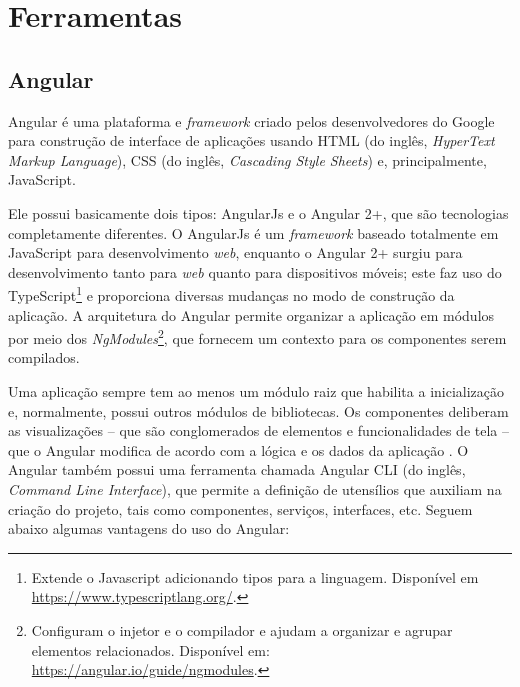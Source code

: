 \section{Ferramentas}
\label{sec:ferramentas}

\subsection{Angular}
\label{ssec:Angular}
Angular\cite{afonso2018angular} é uma plataforma e \textit{framework} criado pelos desenvolvedores do Google para construção de interface de aplicações usando HTML (do inglês, \textit{HyperText Markup Language}), CSS (do inglês, \textit{Cascading Style Sheets}) e, principalmente, JavaScript. 

Ele possui basicamente dois tipos: AngularJs e o Angular 2+, que são tecnologias completamente diferentes. O AngularJs é um \textit{framework} baseado totalmente em JavaScript para desenvolvimento \textit{web}, enquanto o Angular 2+ surgiu para desenvolvimento tanto para \textit{web} quanto para dispositivos móveis; este faz uso do TypeScript\footnote{Extende o Javascript adicionando tipos para a linguagem. Disponível em \url{https://www.typescriptlang.org/}.} e proporciona diversas mudanças no modo de construção da aplicação. A arquitetura do Angular permite organizar a aplicação em módulos por meio dos \textit{NgModules}\footnote{Configuram o injetor e o compilador e ajudam a organizar e agrupar elementos relacionados. Disponível em: \url{https://angular.io/guide/ngmodules}.}, que fornecem um contexto para os componentes serem compilados.

Uma aplicação sempre tem ao menos um módulo raiz que habilita a inicialização e, normalmente, possui outros módulos de bibliotecas. Os componentes deliberam as visualizações -- que são conglomerados de elementos e funcionalidades de tela -- que o Angular modifica de acordo com a lógica e os dados da aplicação \cite{calado2019angular}. O Angular também possui uma ferramenta chamada Angular CLI (do inglês, \textit{Command Line Interface}), que permite a definição de utensílios que auxiliam na criação do projeto, tais como componentes, serviços, interfaces, etc. Seguem abaixo algumas vantagens do uso do Angular:  

